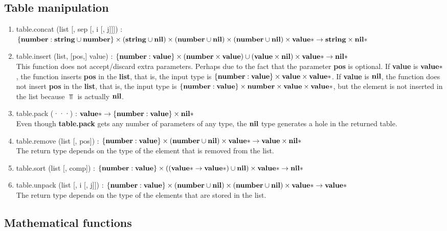 \subsection{Table manipulation}

\begin{enumerate}
\item table.concat (list [, sep [, i [, j]]]) :
$\{ \mathbf{number}:\mathbf{string} \cup \mathbf{number} \} \times
(\mathbf{string} \cup \mathbf{nil}) \times
(\mathbf{number} \cup \mathbf{nil}) \times
(\mathbf{number} \cup \mathbf{nil}) \times
\mathbf{value}{*} \rightarrow
\mathbf{string} \times
\mathbf{nil}{*}$
\item table.insert (list, [pos,] value) :
$\{ \mathbf{number}:\mathbf{value} \} \times
(\mathbf{number} \times \mathbf{value}) \cup
(\mathbf{value} \times \mathbf{nil}) \times
\mathbf{value}{*} \rightarrow
\mathbf{nil}{*}$
\\
This function does not accept/discard extra parameters.
Perhaps due to the fact that the parameter \textbf{pos} is optional.
If \textbf{value} is $\mathbf{value}{*}$, the function inserts \textbf{pos}
in the \textbf{list}, that is, the input type is
$\{ \mathbf{number}:\mathbf{value} \} \times \mathbf{value} \times \mathbf{value}{*}$.
If \textbf{value} is $\mathbf{nil}$, the function does not insert \textbf{pos}
in the \textbf{list}, that is, the input type is
$\{ \mathbf{number}:\mathbf{value} \} \times \mathbf{number} \times \mathbf{value} \times \mathbf{value}{*}$,
but the element is not inserted in the list because $\Top$ is actually $\mathbf{nil}$.
\item table.pack (···) :
$\mathbf{value}{*} \rightarrow
\{ \mathbf{number}:\mathbf{value} \} \times
\mathbf{nil}{*}$
\\
Even though \textbf{table.pack} gets any number of parameters of
any type, the $\mathbf{nil}$ type generates a hole in the returned table.
\item table.remove (list [, pos]) :
$\{ \mathbf{number}:\mathbf{value} \} \times
(\mathbf{number} \cup \mathbf{nil}) \times
\mathbf{value}{*} \rightarrow
\mathbf{value} \times
\mathbf{nil}{*}
$
\\
The return type depends on the type of the element that is removed
from the list.
\item table.sort (list [, comp]) :
$\{ \mathbf{number}:\mathbf{value} \} \times
((\mathbf{value}{*} \rightarrow \mathbf{value}{*}) \cup \mathbf{nil}) \times
\mathbf{value}{*} \rightarrow
\mathbf{nil}{*}$
\item table.unpack (list [, i [, j]]) :
$\{ \mathbf{number}:\mathbf{value} \} \times
(\mathbf{number} \cup \mathbf{nil}) \times
(\mathbf{number} \cup \mathbf{nil}) \times
\mathbf{value}{*} \rightarrow
\mathbf{value}{*}$
\\
The return type depends on the type of the elements that are stored in
the list.
\end{enumerate}

\subsection{Mathematical functions}

